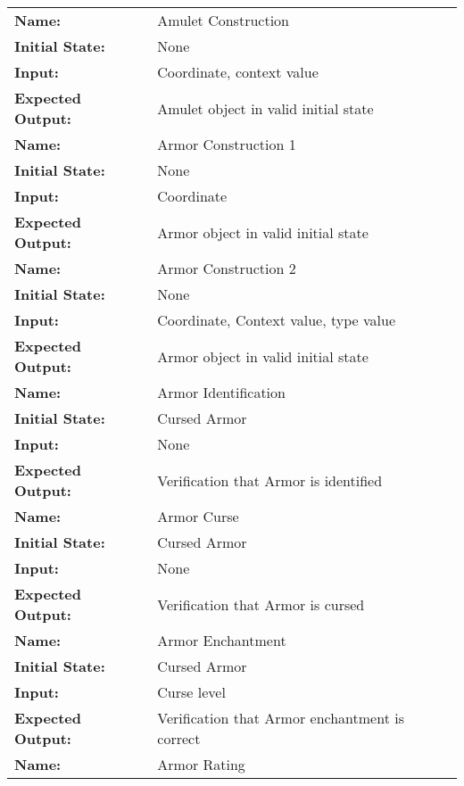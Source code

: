 \documentclass[12pt, titlepage]{article}
\begin{document}
		\begin{center}

			\begin{longtable}{ l | p{10cm} }
				\hline
				\rule{0pt}{1.5em}\textbf{Name:} & Amulet Construction\\
				\textbf{Initial State:} & None\\
				\textbf{Input:} & Coordinate, context value\\
				\textbf{Expected Output:} & Amulet object in valid initial state\\[0.6em]
				\hline
				\rule{0pt}{1.5em}\textbf{Name:} & Armor Construction 1\\
				\textbf{Initial State:} & None\\
				\textbf{Input:} & Coordinate\\
				\textbf{Expected Output:} & Armor object in valid initial state\\[0.6em]
				\hline
				\rule{0pt}{1.5em}\textbf{Name:} & Armor Construction 2\\
				\textbf{Initial State:} & None\\
				\textbf{Input:} & Coordinate, Context value, type value\\
				\textbf{Expected Output:} & Armor object in valid initial state\\[0.6em]
				\hline
				\rule{0pt}{1.5em}\textbf{Name:} & Armor Identification\\
				\textbf{Initial State:} & Cursed Armor\\
				\textbf{Input:} & None\\
				\textbf{Expected Output:} & Verification that Armor is identified\\[0.6em]
				\hline
				\rule{0pt}{1.5em}\textbf{Name:} & Armor Curse\\
				\textbf{Initial State:} & Cursed Armor\\
				\textbf{Input:} & None\\
				\textbf{Expected Output:} & Verification that Armor is cursed\\[0.6em]
				\hline
				\rule{0pt}{1.5em}\textbf{Name:} & Armor Enchantment\\
				\textbf{Initial State:} & Cursed Armor\\
				\textbf{Input:} & Curse level\\
				\textbf{Expected Output:} & Verification that Armor enchantment is correct\\[0.6em]
				\hline
				\rule{0pt}{1.5em}\textbf{Name:} & Armor Rating\\

\end{longtable}
\end{center}
\end{document}
